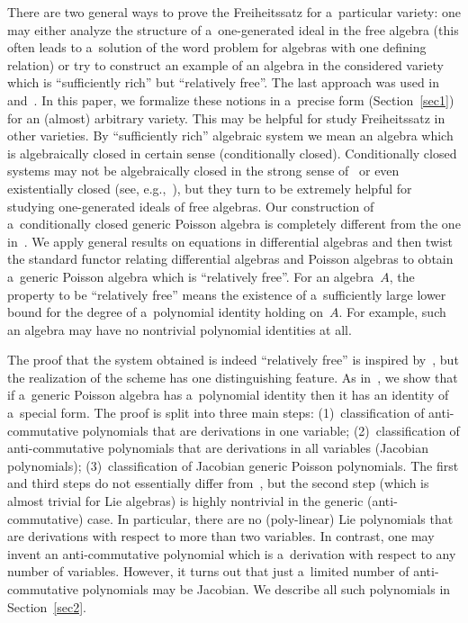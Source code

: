 \documentclass[11pt]{article}
\begin{document}
There are two general ways to prove the Freiheitssatz for a~particular variety: one may either analyze the structure of
a~one-generated ideal in the free algebra (this often leads to a~solution of the word problem for algebras with one
def\/ining relation) or try to construct an example of an algebra in the considered variety which is ``suf\/f\/iciently rich''
but ``relatively free''.
The last approach was used in~\cite{LML85} and~\cite{MLU10}.
In this paper, we formalize these notions in a~precise form (Section~\ref{sec1}) for an (almost) arbitrary variety.
This may be helpful for study Freiheitssatz in other varieties.
By ``suf\/f\/iciently rich'' algebraic system we mean an algebra which is algebraically closed in certain sense
(conditionally closed).
Conditionally closed systems may not be algebraically closed in the strong sense of~\cite{Bokut66} or even existentially
closed (see, e.g.,~\cite{Higman}), but they turn to be extremely helpful for studying one-generated ideals of free
algebras.
Our construction of a~conditionally closed generic Poisson algebra is completely dif\/ferent from the one in~\cite{MLU10}.
We apply general results on equations in dif\/ferential algebras and then twist the standard functor relating dif\/ferential
algebras and Poisson algebras to obtain a~generic Poisson algebra which is ``relatively free''.
For an algebra~$A$, the property to be ``relatively free'' means the existence of a~suf\/f\/iciently large lower bound for
the degree of a~polynomial identity holding on~$A$.
For example, such an algebra may have no nontrivial polynomial identities at all.

The proof that the system obtained is indeed ``relatively free'' is inspired by~\cite{FarkasI}, but the reali\-za\-tion of
the scheme has one distinguishing feature.
As in~\cite{FarkasI}, we show that if a~generic Poisson algebra has a~polynomial identity then it has an identity of
a~special form.
The proof is split into three main steps: (1)~classif\/ication of anti-commutative polynomials that are derivations in one
variable; (2)~classif\/ication of anti-commutative polynomials that are derivations in all variables (Jacobian
polynomials); (3)~classif\/ication of Jacobian generic Poisson polynomials.
The f\/irst and third steps do not essentially dif\/fer from~\cite{FarkasI}, but the second step (which is almost trivial
for Lie algebras) is highly nontrivial in the generic (anti-commutative) case.
In particular, there are no (poly-linear) Lie polynomials that are derivations with respect to more than two variables.
In contrast, one may invent an anti-commutative polynomial which is a~derivation with respect to any number of
variables.
However, it turns out that just a~limited number of anti-commutative polynomials may be Jacobian.
We describe all such polynomials in Section~\ref{sec2}.
\end{document}

